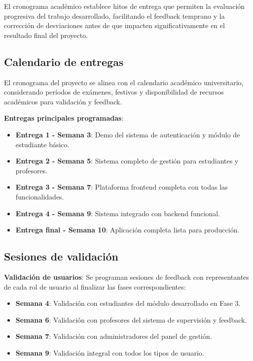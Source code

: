 \documentclass[12pt,a4paper,oneside]{report}
\providecommand{\tightlist}{%
  \setlength{\itemsep}{0pt}\setlength{\parskip}{0pt}}
\begin{document}
El cronograma académico establece hitos de entrega que permiten la
evaluación progresiva del trabajo desarrollado, facilitando el feedback
temprano y la corrección de desviaciones antes de que impacten
significativamente en el resultado final del proyecto.

\subsection{Calendario de entregas}\label{calendario-de-entregas}

El cronograma del proyecto se alinea con el calendario académico
universitario, considerando períodos de exámenes, festivos y
disponibilidad de recursos académicos para validación y feedback.

\textbf{Entregas principales programadas}:

\begin{itemize}
\tightlist
\item
  \textbf{Entrega 1 - Semana 3}: Demo del sistema de autenticación y
  módulo de estudiante básico.
\item
  \textbf{Entrega 2 - Semana 5}: Sistema completo de gestión para
  estudiantes y profesores.
\item
  \textbf{Entrega 3 - Semana 7}: Plataforma frontend completa con todas
  las funcionalidades.
\item
  \textbf{Entrega 4 - Semana 9}: Sistema integrado con backend
  funcional.
\item
  \textbf{Entrega final - Semana 10}: Aplicación completa lista para
  producción.
\end{itemize}

\subsection{Sesiones de validación}\label{sesiones-de-validaciuxf3n}

\textbf{Validación de usuarios}: Se programan sesiones de feedback con
representantes de cada rol de usuario al finalizar las fases
correspondientes:

\begin{itemize}
\tightlist
\item
  \textbf{Semana 4}: Validación con estudiantes del módulo desarrollado
  en Fase 3.
\item
  \textbf{Semana 6}: Validación con profesores del sistema de
  supervisión y feedback.
\item
  \textbf{Semana 7}: Validación con administradores del panel de
  gestión.
\item
  \textbf{Semana 9}: Validación integral con todos los tipos de usuario.
\end{itemize}
\end{document}
